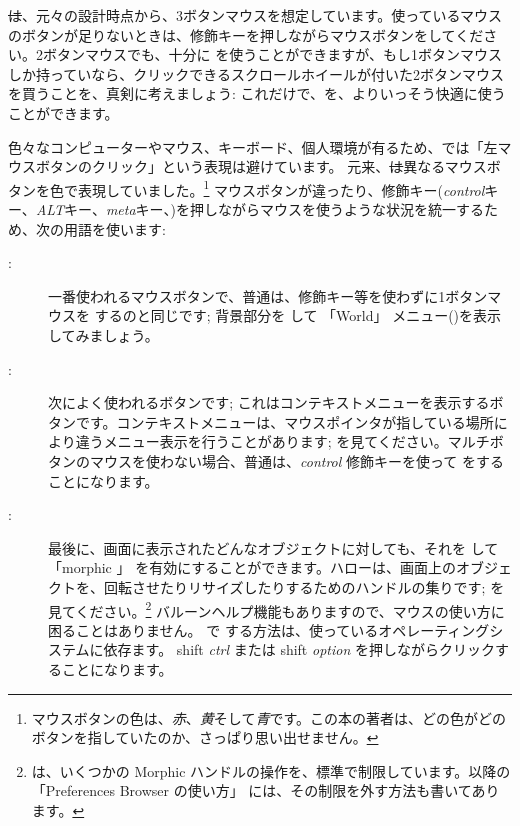 \documentclass[a4paper,10pt,twoside]{book}
\begin{document}
\st は、元々の設計時点から、3ボタンマウスを想定しています。使っているマウスのボタンが足りないときは、修飾キーを押しながらマウスボタンを\click してください。2ボタンマウスでも、十分に \pharo を使うことができますが、もし1ボタンマウスしか持っていなら、クリックできるスクロールホイールが付いた2ボタンマウスを買うことを、真剣に考えましょう: これだけで、\pharo を、よりいっそう快適に使うことができます。

色々なコンピューターやマウス、キーボード、個人環境が有るため、\pharo では「左マウスボタンのクリック」という表現は避けています。
元来、\st は異なるマウスボタンを色で表現していました。\footnote{マウスボタンの色は、\emph{赤}、\emph{黄}そして\emph{青}です。この本の著者は、どの色がどのボタンを指していたのか、さっぱり思い出せません。}
マウスボタンが違ったり、修飾キー(\emph{control}キー、\emph{ALT}キー、\emph{meta}キー、\etc)を押しながらマウスを使うような状況を統一するため、次の用語を使います:
\begin{description}
\item [\click:] 一番使われるマウスボタンで、普通は、修飾キー等を使わずに1ボタンマウスを \click するのと同じです; 背景部分を \click して 「World」 メニュー()を表示してみましょう。
\item [\actclick:] 次によく使われるボタンです; これはコンテキストメニューを表示するボタンです。コンテキストメニューは、マウスポインタが指している場所により違うメニュー表示を行うことがあります; を見てください。マルチボタンのマウスを使わない場合、普通は、\emph{control} 修飾キーを使って \actclick をすることになります。
\item [\metaclick:] 最後に、画面に表示されたどんなオブジェクトに対しても、それを \metaclick して 「morphic 」 を有効にすることができます。ハローは、画面上のオブジェクトを、回転させたりリサイズしたりするためのハンドルの集りです;  を見てください。\footnote{\pharo は、いくつかの Morphic ハンドルの操作を、標準で制限しています。以降の 「Preferences Browser の使い方」 には、その制限を外す方法も書いてあります。}
バルーンヘルプ機能もありますので、マウスの使い方に困ることはありません。
\pharo で \metaclick する方法は、使っているオペレーティングシステムに依存ます。
{\sc shift} \emph{ctrl} または {\sc shift} \emph{option} を押しながらクリックすることになります。
\end{description}
\end{document}
